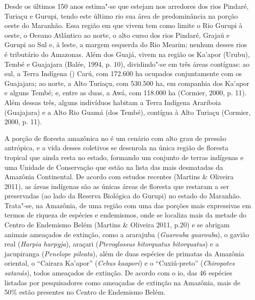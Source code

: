 Desde os últimos 150 anos estima"-se que estejam nos arredores dos rios
Pindaré, Turiaçu e Gurupi, tendo este último rio sua área de
predominância na porção oeste do Maranhão. Essa região em que vivem tem
como limite o Rio Gurupi à oeste, o Oceano Atlântico ao norte, o alto
curso dos rios Pindaré, Grajaú e Gurupi ao Sul e, à leste, a margem
esquerda do Rio Mearim; nenhum desses rios é tributário do Amazonas.
Além dos Guajá, vivem na região os Ka'apor (Urubu), Tembé e Guajajara
(Balée, 1994, p. 10), dividindo"-se em três áreas contíguas: ao sul, a
Terra Indígena () Carú, com 172.600 ha ocupados conjuntamente com os
Guajajara; ao norte, a  Alto Turiaçu, com 530.500 ha, em companhia dos
Ka'apor e alguns Tembé; e, entre as duas, a  Awá, com 118.000 ha
(Cormier, 2000, p. 11). Além dessas três, alguns indivíduos habitam a
Terra Indígena Arariboia (Guajajara) e a  Alto Rio Guamá (dos Tembé),
contígua à  Alto Turiaçu (Cormier, 2000, p. 11).

A porção de floresta amazônica no  é um cenário com alto grau de
pressão antrópica, e a vida desses coletivos se desenrola na única
região de floresta tropical que ainda resta no estado, formando um
conjunto de terras indígenas e uma Unidade de Conservação que estão na
lista das mais desmatadas da Amazônia Continental. De acordo com estudos
recentes (Martins \& Oliveira 2011), as áreas indígenas são as únicas
áreas de floresta que restaram a ser preservadas (ao lado da Reserva
Biológica do Gurupi) no estado do Maranhão. Trata"-se, na Amazônia, de
uma região com uma das porções mais expressivas em termos de riqueza de
espécies e endemismos, onde se localiza mais da metade do Centro de
Endemismo Belém (Martins \& Oliveira 2011, p.20) e se abrigam animais
ameaçados de extinção, como a ararajuba (\emph{Guarouba guarouba}), o
gavião real (\emph{Harpia harpyja}), araçari (\emph{Pteroglossus
bitorquatus bitorquatus}) e a jacupiranga (\emph{Penelope pileata}),
além de duas espécies de primatas da Amazônia oriental, o ``Cairara
Ka'apor'' (\emph{Cebus kaapori}) e o ``Cuxiú-preto'' (\emph{Chiropotes
satanás}), todos ameaçados de extinção. De acordo com o io, das 46
espécies listadas por pesquisadores como ameaçadas de extinção na
Amazônia, mais de 50\% estão presentes no Centro de Endemismo Belém.

